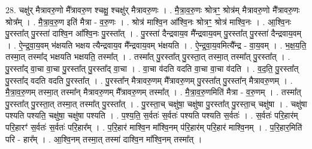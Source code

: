 \documentclass[17pt]{extarticle}
\begin{document}
28. चक्षु॑र् मैत्रावरु॒णो मै᳚त्रावरु॒ण श्चक्षु॒ श्चक्षु॑र् मैत्रावरु॒णः । . मै॒त्रा॒व॒रु॒णः श्रोत्रꣳ॒॒ श्रोत्र॑म् मैत्रावरु॒णो मै᳚त्रावरु॒णः श्रोत्र᳚म् । . मै॒त्रा॒व॒रु॒ण इति॑ मैत्रा - व॒रु॒णः । . श्रोत्र॑ माश्वि॒न आ᳚श्वि॒नः श्रोत्रꣳ॒॒ श्रोत्र॑ माश्वि॒नः । . आ॒श्वि॒नः पु॒रस्ता᳚त् पु॒रस्ता॑ दाश्वि॒न आ᳚श्वि॒नः पु॒रस्ता᳚त् । . पु॒रस्ता॑ दैन्द्रवाय॒व मै᳚न्द्रवाय॒वम् पु॒रस्ता᳚त् पु॒रस्ता॑ दैन्द्रवाय॒वम् । . ऐ॒न्द्र॒वा॒य॒वम् भ॑क्षयति भक्षय त्यैन्द्रवाय॒व मै᳚न्द्रवाय॒वम् भ॑क्षयति । . ऐ॒न्द्र॒वा॒य॒वमित्यै᳚न्द्र - वा॒य॒वम् । . भ॒क्ष॒य॒ति॒ तस्मा॒त् तस्मा᳚द् भक्षयति भक्षयति॒ तस्मा᳚त् । . तस्मा᳚त् पु॒रस्ता᳚त् पु॒रस्ता॒त् तस्मा॒त् तस्मा᳚त् पु॒रस्ता᳚त् । . पु॒रस्ता᳚द् वा॒चा वा॒चा पु॒रस्ता᳚त् पु॒रस्ता᳚द् वा॒चा । . वा॒चा व॑दति वदति वा॒चा वा॒चा व॑दति । . व॒द॒ति॒ पु॒रस्ता᳚त् पु॒रस्ता᳚द् वदति वदति पु॒रस्ता᳚त् । . पु॒रस्ता᳚न् मैत्रावरु॒णम् मै᳚त्रावरु॒णम् पु॒रस्ता᳚त् पु॒रस्ता᳚न् मैत्रावरु॒णम् । . मै॒त्रा॒व॒रु॒णम् तस्मा॒त् तस्मा᳚न् मैत्रावरु॒णम् मै᳚त्रावरु॒णम् तस्मा᳚त् । . मै॒त्रा॒व॒रु॒णमिति॑ मैत्रा - व॒रु॒णम् । . तस्मा᳚त् पु॒रस्ता᳚त् पु॒रस्ता॒त् तस्मा॒त् तस्मा᳚त् पु॒रस्ता᳚त् । . पु॒रस्ता॒च् चक्षु॑षा॒ चक्षु॑षा पु॒रस्ता᳚त् पु॒रस्ता॒च् चक्षु॑षा । . चक्षु॑षा पश्यति पश्यति॒ चक्षु॑षा॒ चक्षु॑षा पश्यति । . प॒श्य॒ति॒ स॒र्वतः॑ स॒र्वतः॑ पश्यति पश्यति स॒र्वतः॑ । . स॒र्वतः॑ परि॒हार॑म् परि॒हारꣳ॑ स॒र्वतः॑ स॒र्वतः॑ परि॒हार᳚म् । . प॒रि॒हार॑ माश्वि॒न मा᳚श्वि॒नम् प॑रि॒हार॑म् परि॒हार॑ माश्वि॒नम् । . प॒रि॒हार॒मिति॑ परि - हार᳚म् । . आ॒श्वि॒नम् तस्मा॒त् तस्मा॑ दाश्वि॒न मा᳚श्वि॒नम् तस्मा᳚त् । \newline
\end{document}
